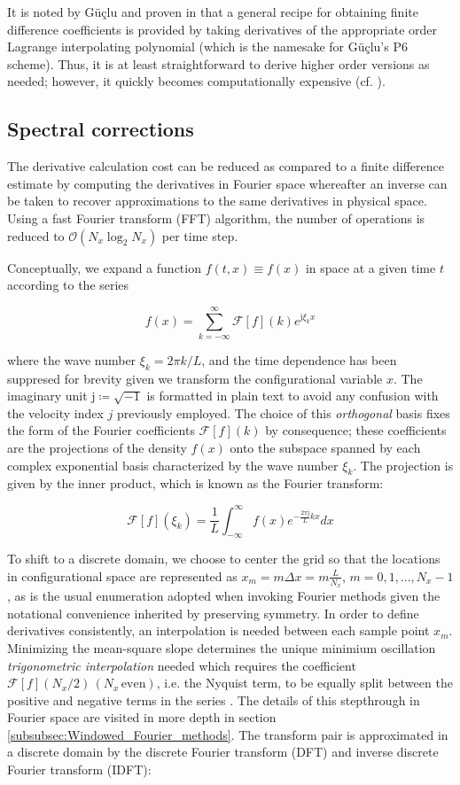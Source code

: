 \documentclass[11pt,titlepage]{report}
\begin{document}
It is noted by G\"{u}\c{c}lu \cite{Guclu14} and proven in \cite{Fornberg88} that a general recipe for obtaining finite difference coefficients is provided by taking derivatives of the appropriate order Lagrange interpolating polynomial (which is the namesake for G\"{u}\c{c}lu's P6 scheme). Thus, it is at least straightforward to derive higher order versions as needed; however, it quickly becomes computationally expensive (cf. \cite{Shukla05}).

\subsection{Spectral corrections}\label{subsubsec:Spectral_derivatives}

\indent\indent The derivative calculation cost can be reduced as compared to a finite difference estimate by computing the derivatives in Fourier space whereafter an inverse can be taken to recover approximations to the same derivatives in physical space. Using a fast Fourier transform (FFT) algorithm, the number of operations is reduced to $\mathcal{O}(N_x \log_2 N_x)$ per time step.

Conceptually, we expand a function $f(t,x) \equiv f(x)$ in space at a given time $t$ according to the series

$$f(x) = \sum_{k = -\infty}^{\infty} \mathcal{F}[f](k) e^{\text{j}\xi_k x}$$

\noindent where the wave number $\xi_k = 2\pi k / L$, and the time dependence has been suppresed for brevity given we transform the configurational variable $x$. The imaginary unit $\text{j} \coloneqq \sqrt{-1}$ is formatted in plain text to avoid any confusion with the velocity index $j$ previously employed. The choice of this \emph{orthogonal} basis fixes the form of the Fourier coefficients $\mathcal{F}[f](k)$ by consequence; these coefficients are the projections of the density $f(x)$ onto the subspace spanned by each complex exponential basis characterized by the wave number $\xi_k$. The projection is given by the inner product, which is known as the Fourier transform:

$$\mathcal{F}[f](\xi_k) = \frac{1}{L}\int_{-\infty}^{\infty} f(x) e^{-\frac{2\pi\text{j}}{L}kx}dx$$

\noindent To shift to a discrete domain, we choose to center the grid so that the locations in configurational space are represented as $x_m = m\Delta x = m\tfrac{L}{N_x}$, $m = 0, 1, \ldots , N_x - 1$, as is the usual enumeration adopted when invoking Fourier methods given the notational convenience inherited by preserving symmetry. In order to define derivatives consistently, an interpolation is needed between each sample point $x_m$. Minimizing the mean-square slope determines the unique minimium oscillation \emph{trigonometric interpolation} needed which requires the coefficient $\mathcal{F}[f](N_x/2)\, (N_x \, \text{even})$, i.e. the Nyquist term, to be equally split between the positive and negative terms in the series \cite{Johnson11}. The details of this stepthrough in Fourier space are visited in more depth in section \ref{subsubsec:Windowed_Fourier_methods}. The transform pair is approximated in a discrete domain by the discrete Fourier transform (DFT) and inverse discrete Fourier transform (IDFT):
\end{document}
